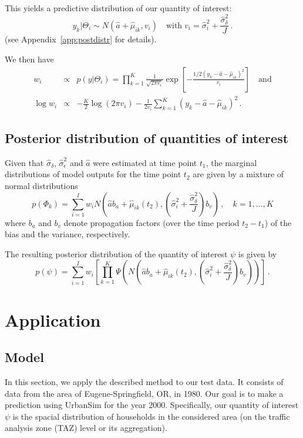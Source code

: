 \documentclass[11pt, fleqn]{article}
\begin{document}
This yields a predictive distribution of our quantity of interest:
\begin{equation}
\label{eq:yk}
y_k | \Theta_i \sim N(\hat{a} + \hat{\mu}_{ik}, v_i)\quad \text{with} \; v_i=\hat{\sigma}_i^2 + \frac{\hat{\sigma}_{\delta}^2}{J}\,.
\end{equation}
(see Appendix~\ref{app:postdistr} for details).

We then have
\begin{eqnarray}
w_i & \propto & p(y|\Theta_i) =  \prod_{k=1}^K \frac{1}{\sqrt{2\pi v_i}}
\exp\left[-\frac{1/2(y_k-\hat{a} - \hat{\mu}_{ik})^2}{v_i}\right] \quad \text{and}\label{eq:wi}\\
\log w_i & \propto  &-\frac{K}{2} \log(2\pi v_i) - \frac{1}{2v_i}\sum_{k=1}^K
(y_k-\hat{a} -\hat{\mu}_{ik})^2 \,.\label{eq:logwi}
\end{eqnarray}

\subsection{Posterior distribution of quantities of interest}
%
Given that $\hat{\sigma}_{\delta}$, $\hat{\sigma}_{\epsilon}^2$ and $\hat{a}$
were estimated at time point $t_1$, the marginal distributions of model
outputs for the time point $t_2$ are given by a mixture of normal
distributions
\begin{equation}
\label{eq:p-phi-marg}
p(\Phi_k) = \sum_{i=1}^I w_i N(\hat{a}b_a + \hat{\mu}_{ik}(t_2), (\hat{\sigma}_i^2 + \frac{\hat{\sigma}_{\delta}^2}{J})b_v)\,,\quad k=1,\dots,K
\end{equation}
where $b_a$ and $b_v$ denote propagation factors (over the time period $t_2 -
t_1$) of the bias and the variance, respectively.

The resulting posterior distribution of the quantity of interest $\psi$ is given by
\begin{equation}
\label{eq:p-psi}
p(\psi) = \sum_{i=1}^I w_i \left[\prod_{k=1}^K \Psi(N(\hat{a}b_a + \hat{\mu}_{ik}(t_2),(\hat{\sigma}_i^2 +
  \frac{\hat{\sigma}_{\delta}^2}{J})b_v))\right]\,.
\end{equation}



\section{Application}
\label{sec:App}
%
\subsection{Model}
%
In this section, we apply the described method to our test data. It consists
of data from the area of Eugene-Springfield, OR, in 1980. Our goal is to make
a prediction using UrbanSim for the year 2000. Specifically, our quantity of
interest $\psi$ is the spacial distribution of households in the considered
area (on the traffic analysis zone (TAZ) level or its aggregation).
\end{document}
